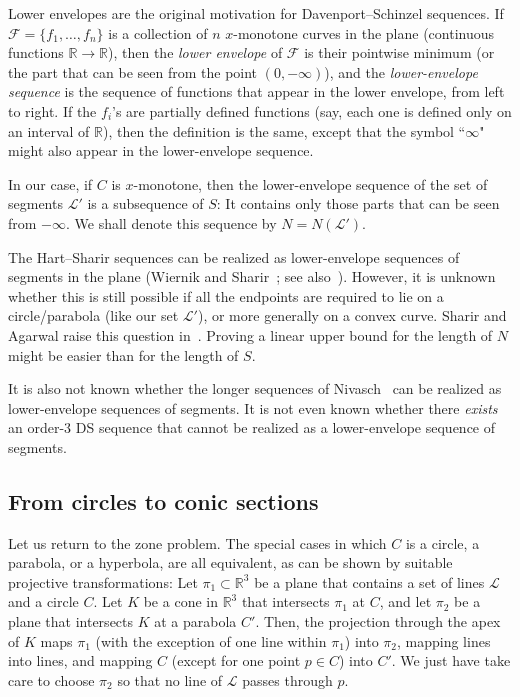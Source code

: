 \documentclass[11pt]{article}
\newcommand{\R}{{\mathbb R}}
\theoremstyle{definition}
\theoremstyle{remark}
\begin{document}
Lower envelopes are the original motivation for Davenport--Schinzel sequences. If $\mathcal F = \{f_1, \ldots,\allowbreak f_n\}$ is a collection of $n$ $x$-monotone curves in the plane (continuous functions $\R\to\R$), then the \emph{lower envelope} of $\mathcal F$ is their pointwise minimum (or the part that can be seen from the point $(0,-\infty)$), and the \emph{lower-envelope sequence} is the sequence of functions that appear in the lower envelope, from left to right. If the $f_i$'s are partially defined functions (say, each one is defined only on an interval of $\R$), then the definition is the same, except that the symbol ``$\infty$" might also appear in the lower-envelope sequence.

In our case, if $C$ is $x$-monotone, then the lower-envelope sequence of the set of segments $\mathcal L'$ is a subsequence of $S$: It contains only those parts that can be seen from $-\infty$. We shall denote this sequence by $N = N(\mathcal L')$.

The Hart--Sharir sequences can be realized as lower-envelope sequences of segments in the plane (Wiernik and Sharir~\cite{WS}; see also~\cite{mat_DG, DS_book}). However, it is unknown whether this is still possible if all the endpoints are required to lie on a circle/parabola (like our set $\mathcal L'$), or more generally on a convex curve. Sharir and Agarwal raise this question in~\cite[p.~112]{DS_book}. Proving a linear upper bound for the length of $N$ might be easier than for the length of $S$.

It is also not known whether the longer sequences of Nivasch~\cite{yo_DS} can be realized as lower-envelope sequences of segments. It is not even known whether there \emph{exists} an order-$3$ DS sequence that cannot be realized as a lower-envelope sequence of segments.

\subsection{From circles to conic sections}\label{subsec_conic}

Let us return to the zone problem. The special cases in which $C$ is a circle, a parabola, or a hyperbola, are all equivalent, as can be shown by suitable projective transformations: Let $\pi_1\subset \R^3$ be a plane that contains a set of lines $\mathcal L$ and a circle $C$. Let $K$ be a cone in $\R^3$ that intersects $\pi_1$ at $C$, and let $\pi_2$ be a plane that intersects $K$ at a parabola $C'$. Then, the projection through the apex of $K$ maps $\pi_1$ (with the exception of one line within $\pi_1$) into $\pi_2$, mapping lines into lines, and mapping $C$ (except for one point $p\in C$) into $C'$. We just have take care to choose $\pi_2$ so that no line of $\mathcal L$ passes through $p$.
\end{document}
